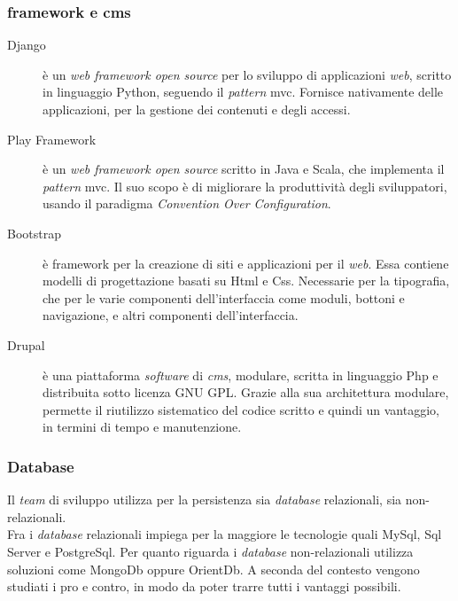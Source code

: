 \subsubsection{\gls{framework} e \gls{cms}}
\begin{description}
\item[Django] è un \emph{web \gls{framework} open source} per lo sviluppo di applicazioni \emph{web}, scritto in linguaggio Python, seguendo il \emph{pattern} \gls{mvc}. Fornisce nativamente delle applicazioni, per la gestione dei contenuti e degli accessi.
\item[Play Framework] è un \emph{web \gls{framework} open source} scritto in Java e Scala, che implementa il \emph{pattern} \gls{mvc}. Il suo scopo è di migliorare la produttività degli sviluppatori, usando il paradigma \emph{Convention Over Configuration}.\newpage
\item[Bootstrap] è \gls{framework} per la creazione di siti e applicazioni per il \emph{web}. Essa contiene modelli di progettazione basati su Html e Css. Necessarie per la tipografia, che per le varie componenti dell'interfaccia come moduli, bottoni e navigazione, e altri componenti dell'interfaccia.
\item[Drupal] è una piattaforma \emph{software} di \emph{\gls{cms}}, modulare, scritta in linguaggio Php e distribuita sotto licenza GNU GPL. Grazie alla sua architettura modulare, permette il riutilizzo sistematico del codice scritto e quindi un vantaggio, in termini di tempo e manutenzione.
\end{description}

\subsubsection{Database}
Il \emph{team} di sviluppo utilizza per la persistenza sia \emph{database} relazionali, sia non-relazionali.\\Fra i \emph{database} relazionali impiega per la maggiore le tecnologie quali MySql, Sql Server e PostgreSql. Per quanto riguarda i \emph{database} non-relazionali utilizza soluzioni come MongoDb oppure OrientDb. A seconda del contesto vengono studiati i pro e contro, in modo da poter trarre tutti i vantaggi possibili.




\newpage
